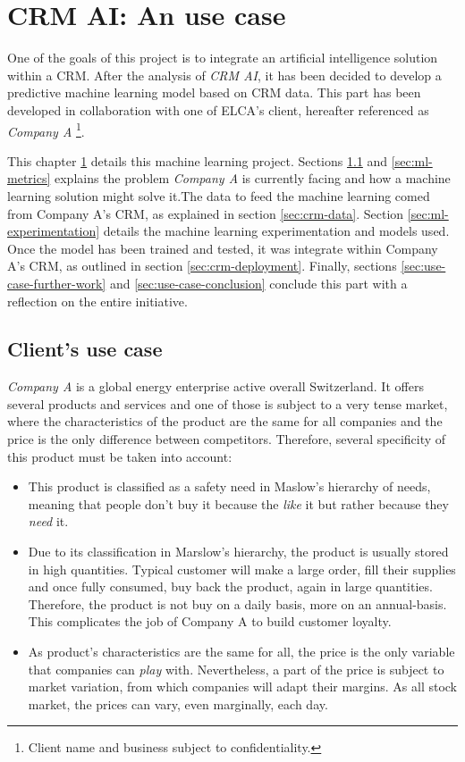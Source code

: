 \chapter{CRM AI: An use case} \label{chapter:use-case}

One of the goals of this project is to integrate an artificial intelligence solution within a CRM. After the analysis of \textit{CRM AI}, it has been decided to develop a predictive machine learning model based on CRM data. This part has been developed in collaboration with one of ELCA's client, hereafter referenced as \textit{Company A} \footnote{Client name and business subject to confidentiality.}.

This chapter \ref{chapter:use-case} details this machine learning project. Sections \ref{sec:use-case} and \ref{sec:ml-metrics} explains the problem \textit{Company A} is currently facing and how a machine learning solution might solve it.The data to feed the machine learning comed from Company A's CRM, as explained in section \ref{sec:crm-data}. Section \ref{sec:ml-experimentation} details the machine learning experimentation and models used. Once the model has been trained and tested, it was integrate within Company A's CRM, as outlined in section \ref{sec:crm-deployment}. Finally, sections \ref{sec:use-case-further-work} and \ref{sec:use-case-conclusion} conclude this part with a reflection on the entire initiative.

\section{Client's use case} \label{sec:use-case}
\textit{Company A} is a global energy enterprise active overall Switzerland. It offers several products and services and one of those is subject to a very tense market, where the characteristics of the product are the same for all companies and the price is the only difference between competitors. Therefore, several specificity of this product must be taken into account:
\begin{itemize}
\item This product is classified as a safety need in Maslow's hierarchy of needs\cite{wiki:Maslow's_hierarchy_of_needs}, meaning that people don't buy it because the \textit{like} it but rather because they \textit{need} it. 
\item Due to its classification in Marslow's hierarchy, the product is usually stored in high quantities. Typical customer will make a large order, fill their supplies and once fully consumed, buy back the product, again in large quantities. Therefore, the product is not buy on a daily basis, more on an annual-basis. This complicates the job of Company A to build customer loyalty.
\item As product's characteristics are the same for all, the price is the only variable that companies can \textit{play} with. Nevertheless, a part of the price is subject to market variation, from which companies will adapt their margins. As all stock market, the prices can vary, even marginally, each day.
\end{itemize}

